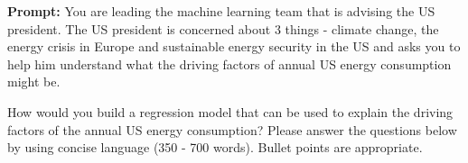 \documentclass[submit]{harvardml}
\begin{document}
\begin{problem}


\textbf{Prompt:} You are leading the machine learning team that is advising the US president. The US president is concerned about 3 things - climate change, the energy crisis in Europe and sustainable energy security in the US and asks you to help him understand what the driving factors of annual US energy consumption might be.  


How would you build a regression model that can be used to explain the driving factors of the annual US energy consumption? Please answer the questions below by using concise language (350 - 700 words). Bullet points are appropriate. 


\begin{enumerate}


\end{enumerate}
\end{problem}
\end{document}
